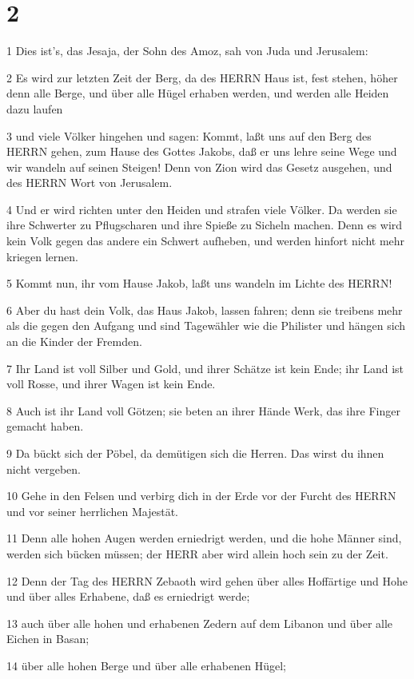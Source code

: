 \chapter{2}

\par 1 Dies ist's, das Jesaja, der Sohn des Amoz, sah von Juda und Jerusalem:
\par 2 Es wird zur letzten Zeit der Berg, da des HERRN Haus ist, fest stehen, höher denn alle Berge, und über alle Hügel erhaben werden, und werden alle Heiden dazu laufen
\par 3 und viele Völker hingehen und sagen: Kommt, laßt uns auf den Berg des HERRN gehen, zum Hause des Gottes Jakobs, daß er uns lehre seine Wege und wir wandeln auf seinen Steigen! Denn von Zion wird das Gesetz ausgehen, und des HERRN Wort von Jerusalem.
\par 4 Und er wird richten unter den Heiden und strafen viele Völker. Da werden sie ihre Schwerter zu Pflugscharen und ihre Spieße zu Sicheln machen. Denn es wird kein Volk gegen das andere ein Schwert aufheben, und werden hinfort nicht mehr kriegen lernen.
\par 5 Kommt nun, ihr vom Hause Jakob, laßt uns wandeln im Lichte des HERRN!
\par 6 Aber du hast dein Volk, das Haus Jakob, lassen fahren; denn sie treibens mehr als die gegen den Aufgang und sind Tagewähler wie die Philister und hängen sich an die Kinder der Fremden.
\par 7 Ihr Land ist voll Silber und Gold, und ihrer Schätze ist kein Ende; ihr Land ist voll Rosse, und ihrer Wagen ist kein Ende.
\par 8 Auch ist ihr Land voll Götzen; sie beten an ihrer Hände Werk, das ihre Finger gemacht haben.
\par 9 Da bückt sich der Pöbel, da demütigen sich die Herren. Das wirst du ihnen nicht vergeben.
\par 10 Gehe in den Felsen und verbirg dich in der Erde vor der Furcht des HERRN und vor seiner herrlichen Majestät.
\par 11 Denn alle hohen Augen werden erniedrigt werden, und die hohe Männer sind, werden sich bücken müssen; der HERR aber wird allein hoch sein zu der Zeit.
\par 12 Denn der Tag des HERRN Zebaoth wird gehen über alles Hoffärtige und Hohe und über alles Erhabene, daß es erniedrigt werde;
\par 13 auch über alle hohen und erhabenen Zedern auf dem Libanon und über alle Eichen in Basan;
\par 14 über alle hohen Berge und über alle erhabenen Hügel;
